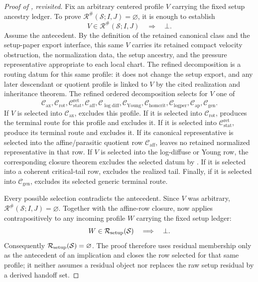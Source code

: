 \documentclass[11pt]{amsart}
\numberwithin{equation}{section}
\theoremstyle{plain}
\theoremstyle{definition}
\theoremstyle{remark}
\newcommand{\calS}{\mathcal S}
\newcommand{\calR}{\mathcal R}
\newcommand{\Cax}{\mathcal C_{\mathrm{ax}}}
\newcommand{\Crot}{\mathcal C_{\mathrm{rot}}}
\newcommand{\Cstat}{\mathcal C_{\mathrm{stat}}^{\mathrm{ret}}}
\newcommand{\Caff}{\mathcal C_{\mathrm{aff}}}
\newcommand{\Cgen}{\mathcal C_{\mathrm{gen}}}
\newcommand{\Chomcrit}{\mathcal C_{\mathrm{homcrit}}}
\newcommand{\Clogper}{\mathcal C_{\mathrm{logper}}}
\newcommand{\Capcrit}{\mathcal C_{\mathrm{ap}}}
\newcommand{\Cyoung}{\mathcal C_{\mathrm{Young}}}
\newcommand{\Clogdiff}{\mathcal C_{\log\mathrm{diff}}}
\begin{document}
\begin{proof}[Proof of , revisited]
Fix an arbitrary centered profile \(V\) carrying the fixed setup ancestry
ledger.  To prove
\(\calR^\#(\calS;I,J)=\varnothing\), it is enough to establish
\[
   V\in\calR^\#(\calS;I,J)\quad\Longrightarrow\quad\bot .
\]
Assume the antecedent.  By the definition of the retained canonical class and
the setup-paper export interface, this same \(V\) carries its retained compact
velocity obstruction, the normalization data, the setup ancestry, and the
pressure representative appropriate to each local chart.  The refined
decomposition is a routing datum for this same profile: it does not change the
setup export, and any later descendant or quotient profile is linked to \(V\)
by the cited realization and inheritance theorem.  The refined ordered
decomposition selects for \(V\) one of
\[
   \Cax,\Crot,\Cstat,\Caff,\Clogdiff,\Cyoung,
   \Chomcrit,\Clogper,\Capcrit,\Cgen .
\]
If \(V\) is selected into \(\Cax\),  excludes this
profile.  If it is selected into \(\Crot\),
 produces the terminal route for this
profile and  excludes it.  If it is selected into
\(\Cstat\),
produce its terminal route and  excludes it.  If its
canonical representative is selected into the affine/parasitic quotient row
\(\Caff\),  leaves no retained
normalized representative in that row.  If \(V\) is selected into the
log-diffuse or Young row, the corresponding closure theorem excludes the
selected datum by
.  If it is
selected into a coherent critical-tail row,
 excludes the realized tail.
Finally, if it is selected into \(\Cgen\),
 excludes its selected generic terminal route.

Every possible selection contradicts the antecedent.  Since \(V\) was
arbitrary, \(\calR^\#(\calS;I,J)=\varnothing\).  Together with the affine-row
closure,  now applies
contrapositively to any incoming profile \(W\) carrying the fixed setup ledger:
\[
   W\in\calR_{\rm setup}(\calS)\quad\Longrightarrow\quad\bot .
\]
Consequently \(\calR_{\rm setup}(\calS)=\varnothing\).  The proof therefore
uses residual membership only as the antecedent of an implication and closes
the row selected for that same profile; it neither assumes a residual object
nor replaces the raw setup residual by a derived handoff set.
\end{proof}
\end{document}
